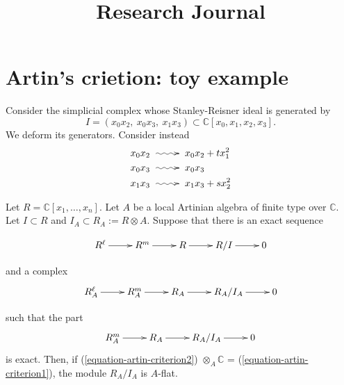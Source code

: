 



\title{Research Journal}
\maketitle

\label{section-phantom}

\tableofcontents

\section{Artin's crietion: toy example}

Consider the simplicial complex whose
Stanley-Reisner ideal is generated by
\begin{equation}
I=(x_0x_2,\ x_0x_3,\ x_1x_3)
\subset \mathbb{C}[x_0,x_1,x_2,x_3].
\end{equation}
We deform its generators. Consider instead
$$
\begin{aligned}
x_0x_2\xymatrix{\ar@{~>}[r]&}&x_0x_2+tx_1^2\\
x_0x_3\xymatrix{\ar@{~>}[r]&}&x_0x_3\\
x_1x_3\xymatrix{\ar@{~>}[r]&}&x_1x_3+sx_2^2
\end{aligned}
$$

\begin{theorem}
\label{theorem-artin-criterion}
Let $R=\mathbb{C}[x_1,\ldots,x_n]$.
Let $A$ be a local Artinian algebra of finite type over $\mathbb{C}$.
Let $I \subset R$ and $I_A \subset R_A:=R\otimes A$.
Suppose that there is an exact sequence

\begin{equation}
\label{equation-artin-criterion1}
\xymatrix{
R^\ell\ar[r]
&R^m\ar[r]
&R\ar[r]
&R/I\ar[r]
&0
}
\end{equation}

\noindent
and a complex
\begin{equation}
\label{equation-artin-criterion2}
\xymatrix{
R^\ell_A\ar[r]
&R^m_A\ar[r]
&R_A\ar[r]
&R_A/I_A\ar[r]
&0
}
\end{equation}

\noindent
such that the part
$$
\xymatrix{
R^m_A\ar[r]
&R_A\ar[r]
&R_A/I_A\ar[r]
&0
}
$$
is exact.
Then, if
(\ref{equation-artin-criterion2})
$\otimes_A\mathbb{C}$
=
(\ref{equation-artin-criterion1}),
the module $R_A/I_A$ is $A$-flat.
\end{theorem}

